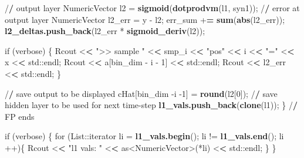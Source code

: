 \documentclass[]{article}
\newenvironment{Shaded}{\begin{snugshade}}{\end{snugshade}}
\newcommand{\KeywordTok}[1]{\textcolor[rgb]{0.13,0.29,0.53}{\textbf{{#1}}}}
\newcommand{\DataTypeTok}[1]{\textcolor[rgb]{0.13,0.29,0.53}{{#1}}}
\newcommand{\DecValTok}[1]{\textcolor[rgb]{0.00,0.00,0.81}{{#1}}}
\newcommand{\StringTok}[1]{\textcolor[rgb]{0.31,0.60,0.02}{{#1}}}
\newcommand{\ErrorTok}[1]{\textcolor[rgb]{0.64,0.00,0.00}{\textbf{{#1}}}}
\newcommand{\NormalTok}[1]{{#1}}
\begin{document}
\begin{Shaded}
\begin{Highlighting}[]
{{      \NormalTok{/}\ErrorTok{/}\StringTok{ }\NormalTok{output layer}
      \NormalTok{NumericVector l2 =}\StringTok{ }\KeywordTok{sigmoid}\NormalTok{(}\KeywordTok{dotprodvm}\NormalTok{(l1, syn1));}
      \NormalTok{/}\ErrorTok{/}\StringTok{ }\NormalTok{error at output layer}
      \NormalTok{NumericVector l2_err =}\StringTok{ }\NormalTok{y -}\StringTok{ }\NormalTok{l2;}
      \NormalTok{err_sum +}\ErrorTok{=}\StringTok{ }\KeywordTok{sum}\NormalTok{(}\KeywordTok{abs}\NormalTok{(l2_err));}
      \KeywordTok{l2_deltas.push_back}\NormalTok{(l2_err *}\StringTok{ }\KeywordTok{sigmoid_deriv}\NormalTok{(l2));}

      \NormalTok{if (verbose) \{}
        \NormalTok{Rcout <}\ErrorTok{<}\StringTok{ ">> sample "} \NormalTok{<}\ErrorTok{<}\StringTok{ }\NormalTok{smp_i <}\ErrorTok{<}\StringTok{ "pos"} \NormalTok{<}\ErrorTok{<}\StringTok{ }\NormalTok{i <}\ErrorTok{<}\StringTok{ "="} \NormalTok{<}\ErrorTok{<}\StringTok{ }\NormalTok{x <}\ErrorTok{<}\StringTok{ }\NormalTok{std::endl;}
        \NormalTok{Rcout <}\ErrorTok{<}\StringTok{ }\NormalTok{a[bin_dim -}\StringTok{ }\NormalTok{i -}\StringTok{ }\DecValTok{1}\NormalTok{] <}\ErrorTok{<}\StringTok{ }\NormalTok{std::endl;}
        \NormalTok{Rcout <}\ErrorTok{<}\StringTok{ }\NormalTok{l2_err <}\ErrorTok{<}\StringTok{ }\NormalTok{std::endl;}
      \NormalTok{\}}

      \NormalTok{/}\ErrorTok{/}\StringTok{ }\NormalTok{save output to be displayed}
      \NormalTok{cHat[bin_dim -i -}\DecValTok{1}\NormalTok{] =}\StringTok{ }\KeywordTok{round}\NormalTok{(l2[}\DecValTok{0}\NormalTok{]);}
      \NormalTok{/}\ErrorTok{/}\StringTok{ }\NormalTok{save hidden layer to be used for next time-step}
      \KeywordTok{l1_vals.push_back}\NormalTok{(}\KeywordTok{clone}\NormalTok{(l1));}
    \NormalTok{\}}
    \NormalTok{/}\ErrorTok{/}\StringTok{ }\NormalTok{FP ends}

    \NormalTok{if (verbose) \{}
      \NormalTok{for (List::iterator }\DataTypeTok{li =} \KeywordTok{l1_vals.begin}\NormalTok{(); li !=}\StringTok{ }\KeywordTok{l1_vals.end}\NormalTok{(); li ++)\{}
        \NormalTok{Rcout <}\ErrorTok{<}\StringTok{ "l1 vals: "} \NormalTok{<}\ErrorTok{<}\StringTok{ }\NormalTok{as<NumericVector>(*li) <}\ErrorTok{<}\StringTok{ }\NormalTok{std::endl;}
      \NormalTok{\}}
    \NormalTok{\}}

}}
\end{Highlighting}
\end{Shaded}
\end{document}
